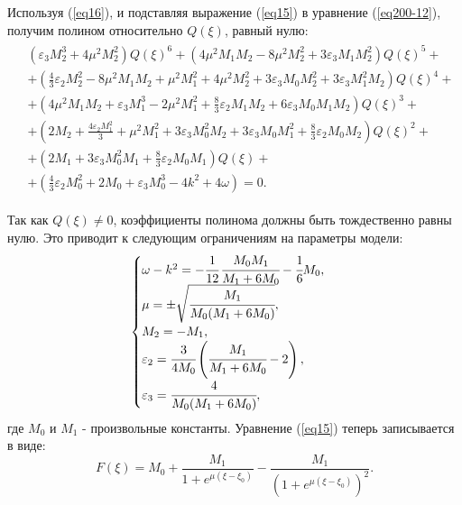 \documentclass[12pt,a4paper]{article}
\begin{document}
	Используя (\ref{eq16}), и подставляя выражение (\ref{eq15}) в уравнение (\ref{eq200-12}), получим полином относительно \(Q(\xi)\), равный нулю:
	\begin{equation}
		\begin{aligned}
			\begin{split}
			&\left(\varepsilon_{3} M_{2}^{3}+4 \mu^{2} M_{2}^{2}\right) Q(\xi)^{6}+
			\left(4 \mu^{2} M_{1} M_{2}-8 \mu^{2} M_{2}^{2}+3 \varepsilon_{3} M_{1} M_{2}^{2}\right) Q(\xi)^{5}+\\
			&+\left(\frac{4}{3} \varepsilon_{2} M_{2}^{2}-8 \mu^{2} M_{1} M_{2}+\mu^{2} M_{1}^{2}+4 \mu^{2} M_{2}^{2}+3 \varepsilon_{3} M_{0} M_{2}^{2}+3 \varepsilon_{3} M_{1}^{2} M_{2}\right) Q(\xi)^{4}+\\
			&+\left(4 \mu^{2} M_{1} M_{2}+\varepsilon_{3} M_{1}^{3}-2 \mu^{2} M_{1}^{2}+\frac{8}{3} \varepsilon_{2} M_{1} M_{2}+6 \varepsilon_{3} M_{0} M_{1} M_{2}\right) Q(\xi)^{3}+\\
			&+\left(2 M_{2}+\frac{4 \varepsilon_{2} M_{1}^{2}}{3 }+\mu^{2} M_{1}^{2}+3 \varepsilon_{3} M_{0}^{2} M_{2}+3 \varepsilon_{3} M_{0} M_{1}^{2}+\frac{8}{3 } \varepsilon_{2} M_{0} M_{2}\right) Q(\xi)^{2}+\\
			&+\left(2 M_{1}+3 \varepsilon_{3} M_{0}^{2} M_{1}+\frac{8}{3} \varepsilon_{2} M_{0} M_{1}\right) Q(\xi)+\\
			&+\left(\frac{4}{3} \varepsilon_{2} M_{0}^{2}+2 M_{0}+\varepsilon_{3} M_{0}^{3}-4 k^{2}+4 \omega\right)=0.
			\end{split}
		\end{aligned}
	\end{equation}

	Так как \(Q(\xi) \neq 0\), коэффициенты полинома должны быть тождественно равны нулю. Это приводит к следующим ограничениям на параметры модели:
	\begin{equation}\label{eq19}
		\begin{cases}
		\omega-k^{2} = -\cfrac{1}{12}\,\cfrac{M_{0} M_{1}}{M_{1}+6M_{0}} -\cfrac{1}{6} M_{0},\\
		\mu=\pm \sqrt{\cfrac{M_{1}}{M_{0}(M_{1}+6M_{0})}},\\
		M_{2}=-M_{1},\\
		\varepsilon_{2} = \cfrac{3}{4 M_{0}}\left(\cfrac{M_{1}}{M_{1}+6M_{0}}-2\right),\\
		\varepsilon_{3}= \cfrac{4}{M_{0}(M_{1}+6M_{0})},
		\end{cases}
	\end{equation}
	где \(M_{0}\) и \(M_{1}\) - произвольные константы. Уравнение (\ref{eq15}) теперь записывается в виде:
	\begin{equation}
		F(\xi)=M_{0}+\frac{M_{1}}{1+e^{\mu(\xi-\xi_{0})}}-\frac{M_{1}}{\left(1+e^{\mu(\xi-\xi_{0})}\right)^{2}}.
	\end{equation}
\end{document}
